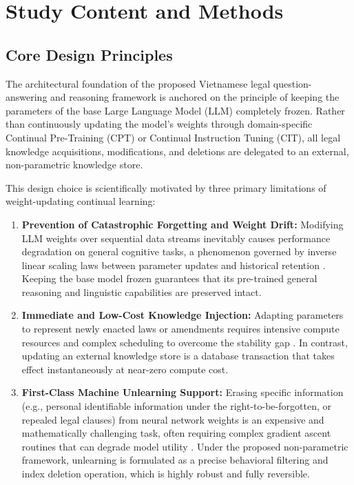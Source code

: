 \section{Study Content and Methods}

\subsection{Core Design Principles}
The architectural foundation of the proposed Vietnamese legal question-answering and reasoning framework is anchored on the principle of keeping the parameters of the base Large Language Model (LLM) completely frozen. Rather than continuously updating the model's weights through domain-specific Continual Pre-Training (CPT) or Continual Instruction Tuning (CIT), all legal knowledge acquisitions, modifications, and deletions are delegated to an external, non-parametric knowledge store. 

This design choice is scientifically motivated by three primary limitations of weight-updating continual learning:
\begin{enumerate}
    \item \textbf{Prevention of Catastrophic Forgetting and Weight Drift:} Modifying LLM weights over sequential data streams inevitably causes performance degradation on general cognitive tasks, a phenomenon governed by inverse linear scaling laws between parameter updates and historical retention \parencite{kalajdzievski2024scalinglawsforgettingfinetuning, li2024revisitingcatastrophicforgettinglarge}. Keeping the base model frozen guarantees that its pre-trained general reasoning and linguistic capabilities are preserved intact.
    \item \textbf{Immediate and Low-Cost Knowledge Injection:} Adapting parameters to represent newly enacted laws or amendments requires intensive compute resources and complex scheduling to overcome the stability gap \parencite{gupta2023continualpretraininglargelanguage, guo2024efficientcontinualpretrainingmitigating}. In contrast, updating an external knowledge store is a database transaction that takes effect instantaneously at near-zero compute cost.
    \item \textbf{First-Class Machine Unlearning Support:} Erasing specific information (e.g., personal identifiable information under the right-to-be-forgotten, or repealed legal clauses) from neural network weights is an expensive and mathematically challenging task, often requiring complex gradient ascent routines that can degrade model utility \parencite{11207222}. Under the proposed non-parametric framework, unlearning is formulated as a precise behavioral filtering and index deletion operation, which is highly robust and fully reversible.
\end{enumerate}

